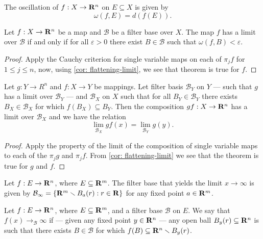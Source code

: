 \begin{definition}[Oscillation]
The oscillation of \(f: X \to \mathbf{R}^n\) on \(E \subseteq X\) is given by
\[
\omega(f, E) = d(f(E)).
\]
\end{definition}

\begin{theorem}
\label{thm: cauchy-criterion several}
Let \(f: X \to \mathbf{R}^n\) be a map and \(\mathcal B\) be a filter base over \(X\).
The map \(f\) has a limit over \(\mathcal B\) if and only if for all
\(\varepsilon > 0\) there exist \(B \in \mathcal B\) such that \(\omega(f, B)
< \varepsilon\).
\end{theorem}

\begin{proof}
Apply the Cauchy criterion for single variable maps on each of \(\pi_j  f\) for
\(1 \leq j \leq n\), now, using \cref{cor: flattening-limit}, we see that theorem
is true for \(f\).
\end{proof}

\begin{theorem}
Let \(g: Y \to R^n\) and \(f: X \to Y\) be mappings. Let filter basis
\(\mathcal B_Y\) on \(Y\) --- such that \(g\) has a limit over \(\mathcal
B_Y\) --- and \(\mathcal B_X\) on \(X\) such that for all \(B_Y \in \mathcal
B_Y\) there exists \(B_X \in \mathcal B_X\) for which \(f(B_X) \subseteq
B_Y\). Then the composition \(g  f: X \to \mathbf{R}^n\) has a limit over
\(\mathcal B_X\) and we have the relation
\[
\lim_{\mathcal B_X} g  f (x) = \lim_{\mathcal B_Y} g(y).
\]
\end{theorem}

\begin{proof}
Apply the property of the limit of the composition of single variable maps to
each of the \(\pi_j  g\) and \(\pi_j  f\). From \cref{cor: flattening-limit} we
see that the theorem is true for \(g\) and \(f\).
\end{proof}

\begin{definition}
Let \(f: E \to \mathbf{R}^n\), where \(E \subseteq \mathbf{R}^m\). The filter base that yields
the limit \(x \to \infty\) is given by \(\mathcal B_\infty = \{\mathbf{R}^m \smallsetminus
B_a(r) : r \in \mathbf{R}\}\) for any fixed point \(a \in \mathbf{R}^m\).
\end{definition}

\begin{definition}
Let \(f: E \to \mathbf{R}^n\), where \(E \subseteq \mathbf{R}^m\), and a filter base
\(\mathcal B\) on \(E\). We say that \(f(x) \to_\mathcal{B} \infty\) if ---
given any fixed point \(y \in \mathbf{R}^n\) --- any open ball \(B_y(r) \subseteq
\mathbf{R}^n\) is such that there exists \(B \in \mathcal B\) for which \(f(B)
\subseteq \mathbf{R}^n \smallsetminus B_y(r)\).
\end{definition}

